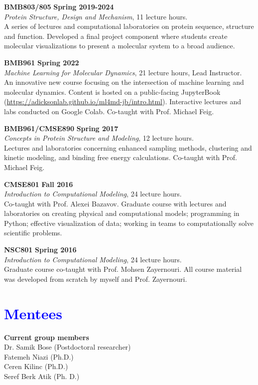 \documentclass[margin,line]{res}
\begin{document}
\begin{resume}
{\bf BMB803/805} \hfill {\bf Spring 2019-2024} \\
\emph{Protein Structure, Design and Mechanism}, 11 lecture hours.\\
A series of lectures and computational laboratories on protein sequence, structure and function.  Developed a final project component where students create molecular visualizations to present a molecular system to a broad audience.

{\bf BMB961} \hfill {\bf Spring 2022}\\
\emph{Machine Learning for Molecular Dynamics}, 21 lecture hours, Lead Instructor.\\
An innovative new course focusing on the intersection of machine learning and molecular dynamics.  Content is hosted on a public-facing JupyterBook (\url{https://adicksonlab.github.io/ml4md-jb/intro.html}).  Interactive lectures and labs conducted on Google Colab.  Co-taught with Prof. Michael Feig.

{\bf BMB961/CMSE890} \hfill {\bf Spring 2017} \\
\emph{Concepts in Protein Structure and Modeling}, 12 lecture hours.\\
Lectures and laboratories concerning enhanced sampling methods, clustering and kinetic modeling, and binding free energy calculations. Co-taught with Prof. Michael Feig.

{\bf CMSE801} \hfill {\bf Fall 2016} \\
\emph{Introduction to Computational Modeling}, 24 lecture hours.\\
Co-taught with Prof. Alexei Bazavov.
Graduate course with lectures and laboratories on creating physical and computational models; programming in Python; effective visualization of data; working in teams to computationally solve scientific problems.

{\bf NSC801} \hfill {\bf Spring 2016} \\
\emph{Introduction to Computational Modeling}, 24 lecture hours.\\
Graduate course co-taught with Prof. Mohsen Zayernouri.
All course material was developed from scratch by myself and Prof. Zayernouri.

\section{\sc \textcolor{blue}{ Mentees }}

{\bf Current group members}\\
Dr. Samik Bose (Postdoctoral researcher) \\
Fatemeh Niazi (Ph.D.) \\
Ceren Kilinc (Ph.D.) \\
Seref Berk Atik (Ph. D.) \\


\end{resume}
\end{document}
